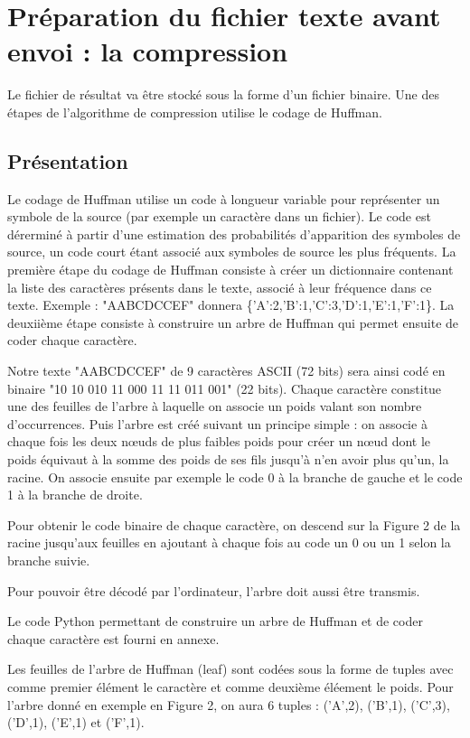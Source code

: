 \documentclass[10pt]{article}
\begin{document}
\section{Préparation du fichier texte avant envoi : la compression}

Le fichier de résultat va être stocké sous la forme d'un fichier binaire. Une des étapes de
l'algorithme de compression utilise le codage de Huffman.

\subsection{Présentation}
Le codage de Huffman utilise un code à longueur variable pour représenter un symbole de la
source (par exemple un caractère dans un fichier). Le code est dérerminé à partir d'une estimation des probabilités d'apparition des symboles de source, un code court étant associé aux symboles de source les plus fréquents. La première étape du codage de Huffman consiste à créer un dictionnaire contenant la liste des caractères présents dans le texte, associé à leur fréquence dans ce texte. Exemple : "AABCDCCEF" donnera \{'A':2,'B':1,'C':3,'D':1,'E':1,'F':1\}. La
deuxiième étape consiste à construire un arbre de Huffman qui permet ensuite de coder chaque
caractère.


Notre texte "AABCDCCEF" de 9 caractères ASCII (72 bits) sera ainsi codé en binaire "10
10 010 11 000 11 11 011 001" (22 bits).
Chaque caractère constitue une des feuilles de l'arbre à laquelle on associe un poids valant
son nombre d'occurrences. Puis l'arbre est créé suivant un principe simple : on associe à chaque
fois les deux n\oe{}uds de plus faibles poids pour créer un n\oe{}ud dont le poids équivaut à la somme des poids de ses fils jusqu'à n'en avoir plus qu'un, la racine. On associe ensuite par exemple le code 0 à la branche de gauche et le code 1 à la branche de droite.

Pour obtenir le code binaire de chaque caractère, on descend sur la Figure 2 de la racine
jusqu'aux feuilles en ajoutant à chaque fois au code un 0 ou un 1 selon la branche suivie.

Pour pouvoir être décodé par l'ordinateur, l'arbre doit aussi être transmis.

Le code Python permettant de construire un arbre de Huffman et de coder chaque caractère
est fourni en annexe.

Les feuilles de l'arbre de Huffman (leaf) sont codées sous la forme de tuples avec comme premier élément le caractère et comme deuxième éléement le poids. Pour l'arbre donné en exemple en Figure 2, on aura 6 tuples : \textsf{('A',2)}, \textsf{('B',1)}, \textsf{('C',3)}, \textsf{('D',1)}, \textsf{('E',1)} et \textsf{('F',1)}.
\end{document}
